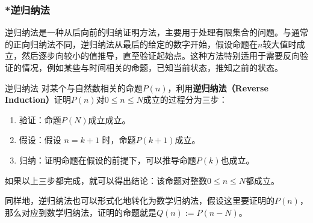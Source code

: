 \subsubsection{*逆归纳法}

逆归纳法是一种从后向前的归纳证明方法，主要用于处理有限集合的问题。与通常的正向归纳法不同，逆归纳法从最后的给定的数字开始，假设命题在$n$较大值时成立，然后逐步向较小的值推导，直至验证起始点。这种方法特别适用于需要反向验证的情况，例如某些与时间相关的命题，已知当前状态，推知之前的状态。

\begin{definition}{逆归纳法}
对某个与自然数相关的命题$P(n)$，利用\textbf{逆归纳法（Reverse Induction）}证明$P(n)$对$0\leq n\leq N$成立的过程分为三步：
\begin{enumerate}
\item 验证：命题$P(N)$成立成立。
\item 假设：假设 $n = k+1$ 时，命题$P(k+1)$成立。
\item 归纳：证明命题在假设的前提下，可以推导命题$P(k)$也成立。
\end{enumerate}
如果以上三步都完成，就可以得出结论：该命题对整数$0\leq n\leq N$都成立。
\end{definition}

同样地，逆归纳法也可以形式化地转化为数学归纳法，假设这里要证明的$P(n)$，那么对应到数学归纳法，证明的命题就是$Q(n):=P(n-N)$。
